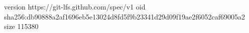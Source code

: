 version https://git-lfs.github.com/spec/v1
oid sha256:db90888a2af1696eb5e13024d8fd5f9b23341d29d09f19ae2f6052caf69005a2
size 115380
